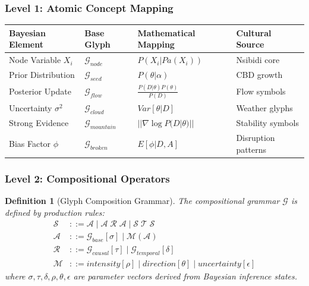 \documentclass[12pt]{article}
\newtheorem{definition}{Definition}
\begin{document}
\subsubsection{Level 1: Atomic Concept Mapping}

\begin{tabularx}{\textwidth}{|l|l|X|l|}
\hline
\textbf{Bayesian Element} & \textbf{Base Glyph} & \textbf{Mathematical Mapping} & \textbf{Cultural Source} \\
\hline
Node Variable $X_i$ & $\mathcal{G}_{node}$ & $P(X_i | Pa(X_i))$ & Nsibidi core \\
\hline
Prior Distribution & $\mathcal{G}_{seed}$ & $P(\theta | \alpha)$ & CBD growth \\
\hline
Posterior Update & $\mathcal{G}_{flow}$ & $\frac{P(D|\theta)P(\theta)}{P(D)}$ & Flow symbols \\
\hline
Uncertainty $\sigma^2$ & $\mathcal{G}_{cloud}$ & $Var[\theta | D]$ & Weather glyphs \\
\hline
Strong Evidence & $\mathcal{G}_{mountain}$ & $||\nabla \log P(D|\theta)||$ & Stability symbols \\
\hline
Bias Factor $\phi$ & $\mathcal{G}_{broken}$ & $E[\phi | D, A]$ & Disruption patterns \\
\hline
\end{tabularx}

\subsubsection{Level 2: Compositional Operators}

\begin{definition}[Glyph Composition Grammar]
The compositional grammar $\mathcal{G}$ is defined by production rules:
\begin{align}
\mathcal{S} &::= \mathcal{A} \mid \mathcal{A} \; \mathcal{R} \; \mathcal{A} \mid \mathcal{S} \; \mathcal{T} \; \mathcal{S} \\
\mathcal{A} &::= \mathcal{G}_{base}[\sigma] \mid \mathcal{M}(\mathcal{A}) \\
\mathcal{R} &::= \mathcal{G}_{causal}[\tau] \mid \mathcal{G}_{temporal}[\delta] \\
\mathcal{M} &::= intensity[\rho] \mid direction[\theta] \mid uncertainty[\epsilon]
\end{align}
where $\sigma, \tau, \delta, \rho, \theta, \epsilon$ are parameter vectors derived from Bayesian inference states.
\end{definition}
\end{document}

